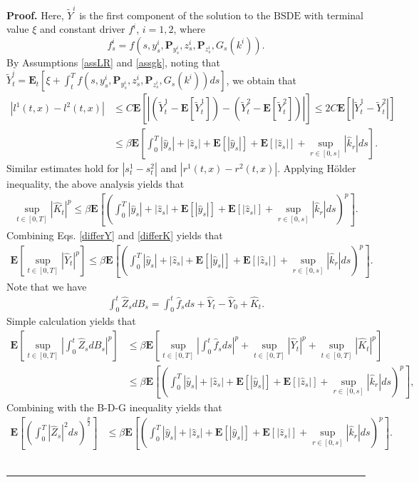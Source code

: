 \documentclass[10pt]{article}%
\numberwithin{equation}{section}
\newenvironment{proof}[1][Proof]{\noindent \textbf{#1.} }{\  \rule{0.5em}{0.5em}}
\def \E{\mathbf{E}}
\def \P{\mathbf{P}}
\begin{document}
\begin{proof}
Here, $\widetilde{Y}^i$ is the first component of the solution to the $\text{BSDE}$ with terminal value $\xi$ and constant driver $f^i$, $i=1,2$, where $$f^i_s=f\left(s,y_s^i,\P_{y_s^i},z_s^i,\P_{z^i_s},G_s(k^i)\right).$$ By Assumptions \ref{assLR} and \ref{assgk}, noting that $\widetilde{Y}^i_t=\E_t\left[\xi+\int_t^T f\left(s,y_s^i,\P_{y_s^i},z_s^i,\P_{z^i_s},G_s(k^i)\right)d s\right]$, we obtain that 
\begin{align*}
\left|l^1(t,x)-l^2(t,x)\right|&\leq C\E\left[\left|\left(\widetilde{Y}^1_t-\E[\widetilde{Y}^1_t]\right)-\left(\widetilde{Y}^2_t-\E[\widetilde{Y}^2_t]\right)\right|\right]\leq 2C\E[|\widetilde{Y}^1_t-\widetilde{Y}^2_t|]\\
&\leq \beta \E\left[\int_0^T |\hat{y}_s|+|\hat{z}_s|+\E[|\hat{y}_s|]+\E[|\hat{z}_s|]+\sup_{r\in[0,s]}|\hat{k}_r|d s\right ].
\end{align*}
Similar estimates hold for $|s^1_t-s^2_t|$ and $|r^1(t,x)-r^2(t,x)|$. 
Applying H{\"o}lder inequality, the above analysis yields that 
\begin{align}\label{differK}
\sup_{t\in[0,T]}|\hat{K}_t|^p\leq \beta\E\left[\left(\int_0^T |\hat{y}_s|+|\hat{z}_s|+\E[|\hat{y}_s|]+\E[|\hat{z}_s|]+\sup_{r\in[0,s]}|\hat{k}_r|ds\right)^p \right].
\end{align}
Combining Eqs. \eqref{differY} and \eqref{differK} yields that 
\begin{align*}
\E\left[\sup_{t\in[0,T]}|\hat{Y}_t|^p\right]\leq \beta\E\left[\left(\int_0^T |\hat{y}_s|+|\hat{z}_s|+\E[|\hat{y}_s|]+\E[|\hat{z}_s|]+\sup_{r\in[0,s]}|\hat{k}_r|d s \right)^p\right].
\end{align*}
Note that we have
\begin{align*}
\int_0^t \hat{Z}_s dB_s=\int_0^t\hat{f}_s ds+\hat{Y}_t-\hat{Y}_0+\hat{K}_t.
\end{align*}
Simple calculation yields that
\begin{align*}
\E\left[\sup_{t\in[0,T]}\left|\int_0^t \hat{Z}_sd B_s\right|^p\right]&\leq \beta\E\left[\sup_{t\in[0,T]}\left|\int_0^t\hat{f}_s ds\right|^p+\sup_{t\in[0,T]}|\hat{Y}_t|^p+\sup_{t\in[0,T]}|\hat{K}_t|^p\right]\\
&\leq \beta\E\left[\left(\int_0^T |\hat{y}_s|+|\hat{z}_s|+\E[|\hat{y}_s|]+\E[|\hat{z}_s|]+\sup_{r\in[0,s]}|\hat{k}_r| ds\right)^p\right],
\end{align*}
Combining with the B-D-G inequality yields that 
\begin{align*}
   \E\left[\left(\int_0^T |\hat{Z}_s|^2 d s\right)^{\frac{p}{2}}\right]&\leq \beta\E\left[\left(\int_0^T |\hat{y}_s|+|\hat{z}_s |+\E[|\hat{y}_s|]+\E[|\hat{z}_s|]+\sup_{r\in[0,s]}|\hat{k}_r| ds\right)^p\right].

\end{align*}
\end{proof}
\end{document}
